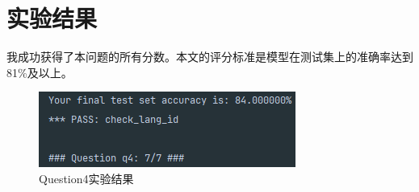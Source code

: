 \section{实验结果}
我成功获得了本问题的所有分数。本文的评分标准是模型在测试集上的准确率达到81\%及以上。
\begin{figure}[htbp]
    \centering
    \includegraphics{pic/q4.png}
    \caption{Question4实验结果}\label{q4}
\end{figure}
%
%
